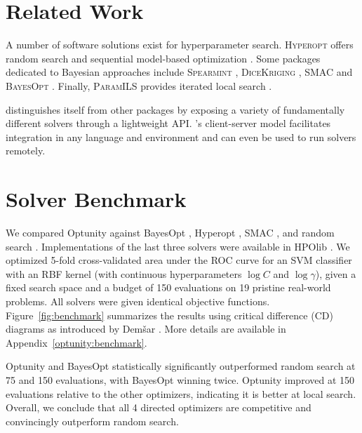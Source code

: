 \section{Related Work}

A number of software solutions exist for hyperparameter search. \textsc{Hyperopt} offers random search and sequential model-based optimization \citep{bergstra2013hyperopt}. Some packages dedicated to Bayesian approaches include \textsc{Spearmint} \citep{snoek2012practical}, \textsc{DiceKriging} \citep{roustant2012dicekriging}, \textsc{SMAC} \citep{hutter2011sequential} and \textsc{BayesOpt} \citep{martinez2014bayesopt}. Finally, \textsc{ParamILS} provides iterated local search \citep{hutter2009paramils}. 

\optunity distinguishes itself from other packages by exposing a variety of fundamentally different solvers through a lightweight API. \optunity's client-server model facilitates integration in any language and environment and can even be used to run solvers remotely.

\section{Solver Benchmark}
We compared Optunity against BayesOpt \citep{martinez2014bayesopt}, Hyperopt \citep{bergstra2013hyperopt}, SMAC \citep{hutter2011sequential}, and random search \citep{bergstra2012random}. Implementations of the last three solvers were available in HPOlib \citep{eggensperger2013towards}. We optimized 5-fold cross-validated area under the ROC curve for an SVM classifier with an RBF kernel (with continuous hyperparameters $\log C$ and $\log \gamma$), given a fixed search space and a budget of 150 evaluations on 19 pristine real-world problems. All solvers were given identical objective functions. Figure~\ref{fig:benchmark} summarizes the results using critical difference (CD) diagrams as introduced by Dem{\v{s}}ar \citep{demvsar2006statistical}. More details are available in Appendix~\ref{optunity:benchmark}.%

Optunity and BayesOpt statistically significantly outperformed random search at 75 and 150 evaluations, with BayesOpt winning twice. Optunity improved at 150 evaluations relative to the other optimizers, indicating it is better at local search. Overall, we conclude that all 4 directed optimizers are competitive and convincingly outperform random search.



